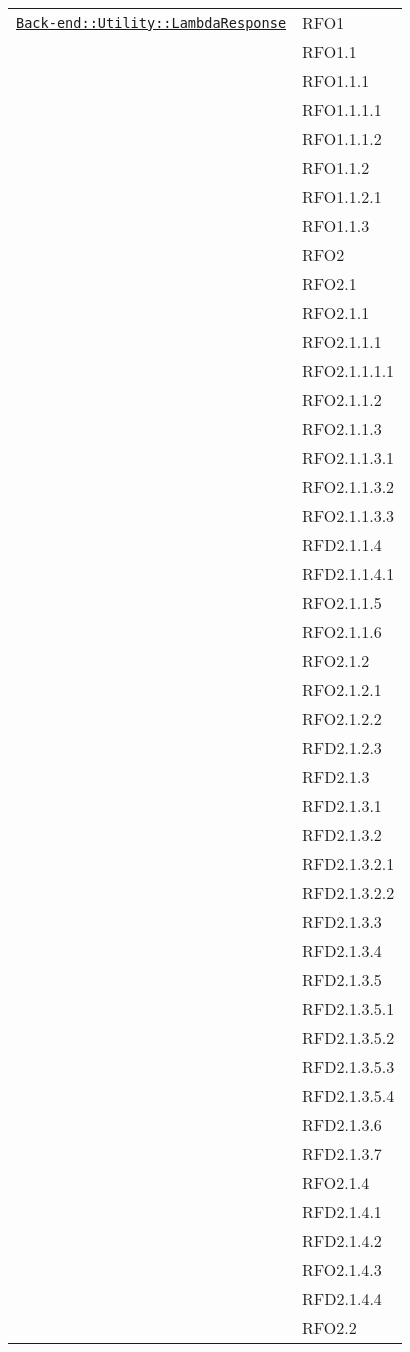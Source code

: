 \begin{longtable}{|>{\centering}m{10cm}|m{3cm}<{\centering}|}
\hyperref[Back-end::Utility::LambdaResponse]{\texttt{Back-end::Utility::LambdaResponse}} & RFO1\\
& RFO1.1\\
& RFO1.1.1\\
& RFO1.1.1.1\\
& RFO1.1.1.2\\
& RFO1.1.2\\
& RFO1.1.2.1\\
& RFO1.1.3\\
& RFO2\\
& RFO2.1\\
& RFO2.1.1\\
& RFO2.1.1.1\\
& RFO2.1.1.1.1\\
& RFO2.1.1.2\\
& RFO2.1.1.3\\
& RFO2.1.1.3.1\\
& RFO2.1.1.3.2\\
& RFO2.1.1.3.3\\
& RFD2.1.1.4\\
& RFD2.1.1.4.1\\
& RFO2.1.1.5\\
& RFO2.1.1.6\\
& RFO2.1.2\\
& RFO2.1.2.1\\
& RFO2.1.2.2\\
& RFD2.1.2.3\\
& RFD2.1.3\\
& RFD2.1.3.1\\
& RFD2.1.3.2\\
& RFD2.1.3.2.1\\
& RFD2.1.3.2.2\\
& RFD2.1.3.3\\
& RFD2.1.3.4\\
& RFD2.1.3.5\\
& RFD2.1.3.5.1\\
& RFD2.1.3.5.2\\
& RFD2.1.3.5.3\\
& RFD2.1.3.5.4\\
& RFD2.1.3.6\\
& RFD2.1.3.7\\
& RFO2.1.4\\
& RFD2.1.4.1\\
& RFD2.1.4.2\\
& RFO2.1.4.3\\
& RFD2.1.4.4\\
& RFO2.2\\

\end{longtable}
